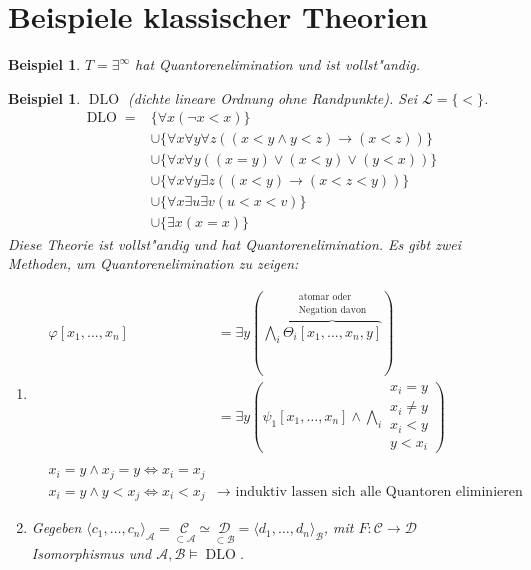 \documentclass[a4paper,12pt,numbers=noenddot,parskip=full]{scrartcl}
\newcommand{\scrL}{\mathcal{L}}
\newcommand{\scrA}{\mathcal{A}}
\newcommand{\scrB}{\mathcal{B}}
\newcommand{\scrC}{\mathcal{C}}
\newcommand{\scrD}{\mathcal{D}}
\DeclareMathOperator{\dlo}{DLO}
\theoremstyle{dotless}
\newtheorem{example}[theorem]{Beispiel}
\theoremstyle{remark}
\begin{document}
\section{Beispiele klassischer Theorien}
\begin{example}
	$T=\exists^\infty$ hat Quantorenelimination und ist vollst"andig.
\end{example}

\begin{example}
		$\dlo$ (dichte lineare Ordnung ohne Randpunkte). Sei $\scrL = \{<\}$.
	\begin{align*}
		\dlo = &\{\forall x (\lnot x<x) \}\\
		&\cup \{\forall x \forall y \forall z ((x<y \land y<z) \rightarrow (x<z)) \}\\
		&\cup \{\forall x \forall y ((x=y)\lor(x<y)\lor(y<x)) \}\\
		&\cup \{\forall x \forall y \exists z ((x<y)\rightarrow(x<z<y)) \}\\
		&\cup \{\forall x \exists u \exists v (u<x<v) \}\\
		&\cup \{\exists x (x=x) \}
	\end{align*}
	Diese Theorie ist vollst"andig und hat Quantorenelimination.
	Es gibt zwei Methoden, um Quantorenelimination zu zeigen:
	\begin{enumerate}
		\item
		\begin{align*}
			&\varphi[x_1, \dots,x_n] &= \exists y (\bigwedge\limits_i \overbrace{\Theta_i[x_1, \dots,x_n, y]}^{\substack{\text{atomar oder} \\ \text{Negation davon}}})\\
			&&= \exists y (\psi_1[x_1, \dots, x_n] \land \bigwedge\limits_i \substack{x_i = y \\ x_i \neq y \\ x_i < y \\ y < x_i})\\ \\
			&x_i=y \land x_j=y \Leftrightarrow x_i = x_j\\
			&x_i = y \land y<x_j \Leftrightarrow x_i < x_j &\longrightarrow \text{ induktiv lassen sich alle Quantoren eliminieren}
		\end{align*}
		\item Gegeben $\langle c_1, \dots, c_n \rangle_\scrA = \underset{\subset \scrA}{\scrC} \simeq \underset{\subset \scrB}{\scrD} = \langle d_1, \dots, d_n \rangle_\scrB$, mit $F: \scrC \rightarrow \scrD$ Isomorphismus und $\scrA, \scrB \models \dlo$.
		

\end{enumerate}
\end{example}
\end{document}
